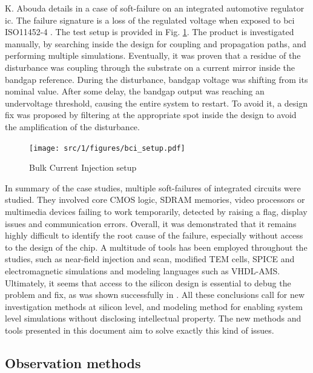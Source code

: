 K. Abouda details in \cite{softfailEMCIC} a case of soft-failure on an integrated automotive regulator \gls{ic}.
The failure signature is a loss of the regulated voltage when exposed to \gls{bci} ISO11452-4 \cite{iso11452}.
The test setup is provided in Fig. \ref{fig:bci-setup}.
The product is investigated manually, by searching inside the design for coupling and propagation paths, and performing multiple simulations.
Eventually, it was proven that a residue of the disturbance was coupling through the substrate on a current mirror inside the bandgap reference.
During the disturbance, bandgap voltage was shifting from its nominal value.
After some delay, the bandgap output was reaching an undervoltage threshold, causing the entire system to restart.
To avoid it, a design fix was proposed by filtering at the appropriate spot inside the design to avoid the amplification of the disturbance.

\begin{figure}[!h]
  \centering
  \texttt{[image: src/1/figures/bci\_setup.pdf]}
  \caption{Bulk Current Injection setup}
  \label{fig:bci-setup}
\end{figure}

In summary of the case studies, multiple soft-failures of integrated circuits were studied.
They involved core CMOS logic, SDRAM memories, video processors or multimedia devices failing to work temporarily, detected by raising a flag, display issues and communication errors.
Overall, it was demonstrated that it remains highly difficult to identify the root cause of the failure, especially without access to the design of the chip.
A multitude of tools has been employed throughout the studies, such as near-field injection and scan, modified TEM cells, SPICE and electromagnetic simulations and modeling languages such as VHDL-AMS.
Ultimately, it seems that access to the silicon design is essential to debug the problem and fix, as was shown successfully in \cite{softfailEMCIC}.
All these conclusions call for new investigation methods at silicon level, and modeling method for enabling system level simulations without disclosing intellectual property.
The new methods and tools presented in this document aim to solve exactly this kind of issues.

\subsection{Observation methods}

